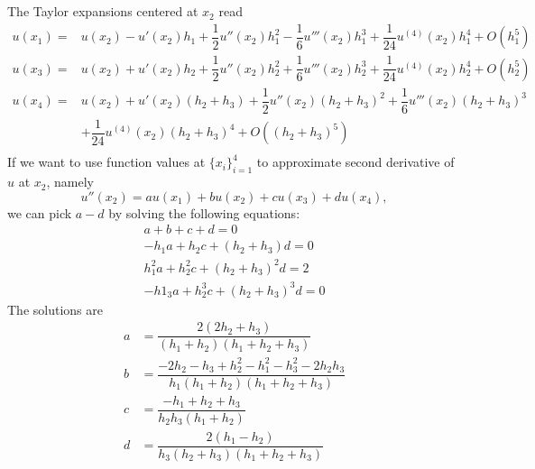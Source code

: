 \documentclass[11pt]{article}
\begin{document}
\maketitle
\pagebreak
\section{}
\subsection{}
The Taylor expansions centered at $x_2$ read
\begin{equation}\begin{split}
u(x_1) =& u(x_2) - u'(x_2)h_1 + \dfrac12 u''(x_2)h_1^2-\dfrac16u'''(x_2)h_1^3+\dfrac1{24}u^{(4)}(x_2)h_1^4+O(h_1^5)\\
u(x_3) =& u(x_2) + u'(x_2)h_2 + \dfrac12 u''(x_2)h_2^2+\dfrac16u'''(x_2)h_2^3+\dfrac1{24}u^{(4)}(x_2)h_2^4+O(h_2^5)\\
u(x_4) =& u(x_2) + u'(x_2)(h_2+h_3) + \dfrac12 u''(x_2)(h_2+h_3)^2+\dfrac16u'''(x_2)(h_2+h_3)^3 \\
	& +\dfrac1{24}u^{(4)}(x_2)(h_2+h_3)^4+O((h_2+h_3)^5) \\
\end{split}\end{equation} 
If we want to use function values at $\{x_i\}_{i=1}^4$ to approximate second derivative of $u$ at $x_2$, namely
$$u''(x_2) = au(x_1)+bu(x_2)+cu(x_3)+du(x_4),$$
we can pick $a-d$ by solving the following equations:
\begin{equation}\begin{split}
a+b+c+d = 0 \\
-h_1a+h_2c+(h_2+h_3)d = 0 \\
h_1^2a + h_2^2c+(h_2+h_3)^2d = 2 \\
-h1_3a+h_2^3c+(h_2+h_3)^3d = 0
\end{split}\end{equation} 
The solutions are
\begin{equation}\begin{split}
a &= \dfrac{2(2h_2+h_3)}{(h_1+h_2)(h_1+h_2+h_3)} \\
b &= \dfrac{-2h_2-h_3+h_2^2-h_1^2-h_3^2-2h_2h_3}{h_1(h_1+h_2)(h_1+h_2+h_3)}\\
c &= \dfrac{-h_1+h_2+h_3}{h_2h_3(h_1+h_2)} \\
d &= \dfrac{2(h_1-h_2)}{h_3(h_2+h_3)(h_1+h_2+h_3)}
\end{split}\nonumber\end{equation} 
\end{document}
